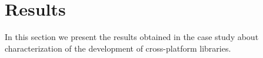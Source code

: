 \documentclass[10pt, conference]{IEEEtran}
\begin{document}
\section{Results}
In this section we present the results obtained in the case study about characterization of the development of cross-platform libraries. 







\end{document}
